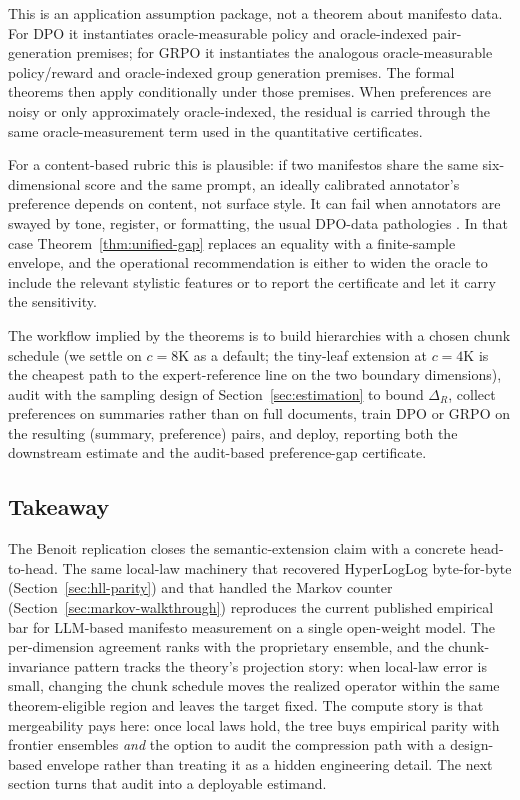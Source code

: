 This is an application assumption package, not a theorem about manifesto
data. For DPO it instantiates oracle-measurable policy and
oracle-indexed pair-generation premises; for GRPO it instantiates the
analogous oracle-measurable policy/reward and oracle-indexed group
generation premises. The formal theorems then apply conditionally under
those premises. When preferences are noisy or only approximately
oracle-indexed, the residual is carried through the same
oracle-measurement term used in the quantitative certificates.

For a content-based rubric this is plausible: if two manifestos share
the same six-dimensional score and the same prompt, an ideally
calibrated annotator's preference depends on content, not surface
style. It can fail when annotators are swayed by tone, register, or
formatting, the usual DPO-data pathologies \citep{RafailovEtAl2023DPO}.
In that case Theorem~\ref{thm:unified-gap} replaces an equality with a
finite-sample envelope, and the operational recommendation is either
to widen the oracle to include the relevant stylistic features or to
report the certificate and let it carry the sensitivity.

The workflow implied by the theorems is to build hierarchies with a chosen chunk schedule (we settle on $c = 8\mathrm{K}$ as a default; the tiny-leaf extension at $c = 4\mathrm{K}$ is the cheapest path to the expert-reference line on the two boundary dimensions), audit with the sampling design of Section~\ref{sec:estimation} to bound $\Delta_R$, collect preferences on summaries rather than on full documents, train DPO or GRPO on the resulting (summary, preference) pairs, and deploy, reporting both the downstream estimate and the audit-based preference-gap certificate.

\subsection{Takeaway}

The Benoit replication closes the semantic-extension claim with a
concrete head-to-head. The same local-law machinery that recovered
HyperLogLog byte-for-byte (Section~\ref{sec:hll-parity}) and that
handled the Markov counter (Section~\ref{sec:markov-walkthrough})
reproduces the current published empirical bar for LLM-based
manifesto measurement on a single open-weight model. The per-dimension
agreement ranks with the proprietary ensemble, and the chunk-invariance
pattern tracks the theory's projection story: when local-law error is
small, changing the chunk schedule moves the realized operator within the
same theorem-eligible region and leaves the target fixed. The compute
story is that mergeability pays here: once local laws hold, the tree
buys empirical parity with frontier ensembles \emph{and} the option to
audit the compression path with a design-based envelope rather than
treating it as a hidden engineering detail. The next section turns
that audit into a deployable estimand.
